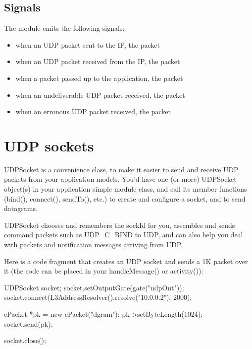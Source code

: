
\subsection{Signals}

The  module emits the following signals:
\begin{itemize}
  \item {} when an UDP packet sent to the IP, the packet
  \item {} when an UDP packet received from the IP, the packet
  \item {} when a packet passed up to the application, the packet
  \item {} when an undeliverable UDP packet received, the packet
  \item {} when an erronous UDP packet received, the packet
\end{itemize}

\section{UDP sockets}

UDPSocket is a convenience class, to make it easier to send and receive
UDP packets from your application models. You'd have one (or more)
UDPSocket object(s) in your application simple module class, and call
its member functions (bind(), connect(), sendTo(), etc.) to create and
configure a socket, and to send datagrams.

UDPSocket chooses and remembers the sockId for you, assembles and sends command
packets such as UDP\_C\_BIND to UDP, and can also help you deal with packets and
notification messages arriving from UDP.

Here is a code fragment that creates an UDP socket and sends a 1K packet
over it (the code can be placed in your handleMessage() or activity()):

\begin{cpp}
UDPSocket socket;
socket.setOutputGate(gate("udpOut"));
socket.connect(L3AddressResolver().resolve("10.0.0.2"), 2000);

cPacket *pk = new cPacket("dgram");
pk->setByteLength(1024);
socket.send(pk);

socket.close();
\end{cpp}


